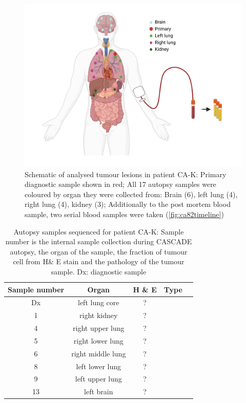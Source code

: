 \begin{figure}[ht]
\centering
\includegraphics[width=.99\linewidth]{Figures/CASCADE/CA82/CA-K_schematic_CA82_organColours}
\caption[Schematic of analysed tumour lesions in patient CA-K]{Schematic of analysed tumour lesions in patient CA-K: Primary diagnostic sample shown in red; All 17 autopsy samples were coloured by organ they were collected from: Brain (6), left lung (4), right lung (4), kidney (3); Additionally to the post mortem blood sample, two serial blood samples were taken (\protect\autoref{fig:ca82timeline})} \label{fig:cas82schematic}
\end{figure}

\begin{table}[ht]
\caption[Autopsy samples sequenced for patient CA-K]{Autopsy samples sequenced for patient CA-K: Sample number is the internal sample collection during CASCADE autopsy, the organ of the sample, the fraction of tumour cell from H\& E stain and the pathology of the tumour sample. Dx: diagnostic sample}\label{tab:ca82wgsSamples}
\centering
{}
\begin{tabular}{|c|c|c|c|c|}
\toprule
\hline
 \rowcolor{gray!50}
\textbf{Sample number} & \textbf{Organ} & \textbf{H \& E} & \textbf{Type}\\
\hline
 Dx & left lung core & ? & \cellcolor{white} \\
 1 & right kidney & ? & \cellcolor{white} \\
 4 & right upper lung & ? & \cellcolor{white} \\
 5 & right lower lung & ? & \cellcolor{white} \\
 6 & right middle lung & ? & \cellcolor{white} \\
 8 & left lower lung & ? & \cellcolor{white} \\
 9 & left upper lung & ? & \cellcolor{white} \\
 13 & left brain & ? & \cellcolor{white}\multirow{-7}{*}{adenocarcinoma} \\
 \hline
\bottomrule
\end{tabular}
\end{table} 


